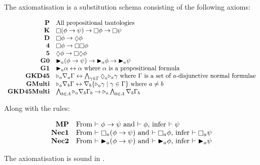 \begin{definition}[\axiomKDF]
The axiomatisation \axiomKDF{} is a substitution schema consisting of the
following axioms:

$$
\begin{array}{rl}
{\bf P} & \text{All propositional tautologies}\\
{\bf K} & \knows (\phi \implies \psi) \implies \knows \phi \implies \knows
\psi\\
{\bf D} & \knows \phi \implies \suspects \phi\\
{\bf 4} & \knows \phi \implies \knows \knows \phi\\
{\bf 5} & \suspects \phi \implies \knows \suspects \phi\\
{\bf G0} & \allrefs_a (\phi \implies \psi) \implies \allrefs_a \phi \implies
\allrefs_a \psi\\
{\bf G1} & \allrefs_a \alpha \iff \alpha \text{ where $\alpha$ is a
propositional formula}\\
{\bf GKD45} & \somerefs_a \covers_a \Gamma \iff \bigwedge_{\gamma \in \Gamma}
\suspects_a \somerefs_a \gamma \text{ where $\Gamma$ is a set of $a$-disjunctive
normal formulae}\\
{\bf GMulti} & \somerefs_a \covers_b \Gamma \iff \covers_b \{\somerefs_a \gamma
\mid \gamma \in \Gamma\} \text{ where $a \neq b$}\\
{\bf GKD45Multi} & \bigwedge_{b \in A} \somerefs_a \covers_b \Gamma_b \implies
\somerefs_a \bigwedge_{b \in A} \covers_b \Gamma_b
\end{array}
$$

Along with the rules:

$$
\begin{array}{rl}
{\bf MP} & \text{From $\proves \phi \implies \psi$ and $\proves \phi$, infer
$\proves \psi$}\\
{\bf Nec1} & \text{From $\proves \knows_a (\phi \implies \psi)$ and $\proves
\knows_a \phi$, infer $\proves \knows_a \psi$}\\
{\bf Nec2} & \text{From $\proves \allrefs_a (\phi \implies \psi)$ and $\proves
\allrefs_a \phi$, infer $\proves \allrefs_a \psi$}
\end{array}
$$
\end{definition}

\begin{lemma}
The axiomatisation \axiomKDF{} is sound in \logicKDF{}.
\end{lemma}

